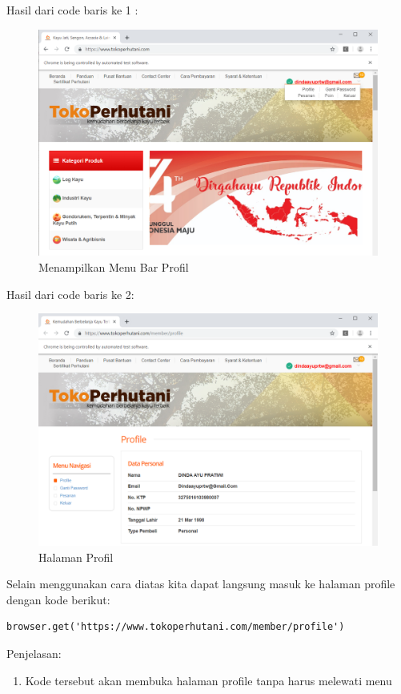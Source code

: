 Hasil dari code baris ke 1 :
\begin{figure}[h]
	\centering
	\includegraphics[scale=0.3]{figures/6menubar}
	\caption{Menampilkan Menu Bar Profil}
\end{figure}
\newpage
Hasil dari code baris ke 2:
\begin{figure}[h]
	\centering
	\includegraphics[scale=0.25]{figures/6profile}
	\caption{Halaman Profil}
\end{figure}

Selain menggunakan cara diatas kita dapat langsung masuk ke halaman profile dengan kode berikut:

\begin{verbatim}
browser.get('https://www.tokoperhutani.com/member/profile')
\end{verbatim}

Penjelasan: 
\begin{enumerate}
	\item Kode tersebut akan membuka halaman profile tanpa harus melewati menu 
\end{enumerate}

